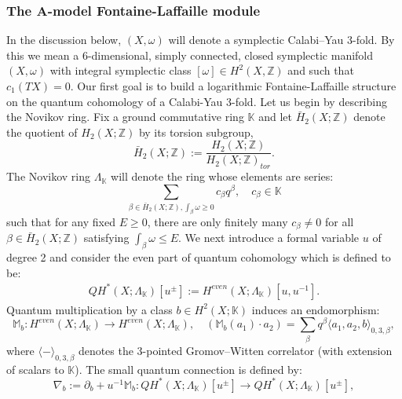 \documentclass[reqno]{amsart}
\numberwithin{equation}{section}
\numberwithin{equation}{section}
\numberwithin{equation}{section}
\theoremstyle{definition}
\theoremstyle{remark}
\theoremstyle{remark}
\begin{document}
\subsubsection{The A-model Fontaine-Laffaille module}
 In the discussion below, $(X,\omega)$ will denote a symplectic Calabi--Yau $3$-fold. By this we mean a $6$-dimensional, simply connected, closed symplectic manifold $(X,\omega)$ with integral symplectic class $[\omega] \in H^2(X,\mathbb{Z})$ and such that $c_1(TX)=0$. Our first goal is to build a logarithmic Fontaine-Laffaille structure on the quantum cohomology of a Calabi-Yau 3-fold. Let us begin by describing the Novikov ring. Fix a ground commutative ring $\mathbb{K}$ and let $\bar{H}_2(X;\mathbb{Z})$ denote the quotient of $H_2(X;\mathbb{Z})$ by its torsion subgroup, $$\bar{H}_2(X;\mathbb{Z}):=\frac{H_2(X;\mathbb{Z})}{H_2(X;\mathbb{Z})_{tor}}.$$ The Novikov ring $\Lambda_{\mathbb{K}}$ will denote the ring whose elements are series:
\begin{equation}
\sum_{\beta \in \bar{H}_2(X; \mathbb{Z}), \int_\beta \omega \geq 0} c_\beta q^\beta, \quad c_\beta \in \mathbb{K}
\end{equation}
such that for any fixed $E \geq 0$, there are only finitely many $c_\beta \neq 0$ for all $\beta \in \bar{H}_2(X; \mathbb{Z})$ satisfying $\int_\beta \omega \leq E$. We next introduce a formal variable $u$ of degree 2 and consider the even part of quantum cohomology which is defined to be: \begin{align} QH^*(X;\Lambda_{\mathbb{K}})[u^{\pm}]:=H^{even}(X; \Lambda_\mathbb{K})[u,u^{-1}]. \end{align} 
Quantum multiplication by a class $b \in H^2(X; \mathbb{K})$ induces an endomorphism:  \begin{equation}
\mathbb{M}_b : H^{even}(X; \Lambda_\mathbb{K}) \to H^{even}(X; \Lambda_\mathbb{K}), \quad (\mathbb{M}_b(a_1) \cdot a_2) = \sum_{\beta} q^\beta \langle a_1, a_2, b \rangle_{0,3,\beta},
\end{equation}
where $\langle - \rangle_{0,3,\beta}$ denotes the 3-pointed Gromov–Witten correlator (with extension of scalars to $\mathbb{K}$). The small quantum connection is defined by:  
\begin{equation}
\nabla_b := \partial_b + u^{-1} \mathbb{M}_b : QH^*(X;\Lambda_{\mathbb{K}})[u^{\pm}] \to QH^*(X;\Lambda_{\mathbb{K}})[u^{\pm}],
\end{equation}
\end{document}
